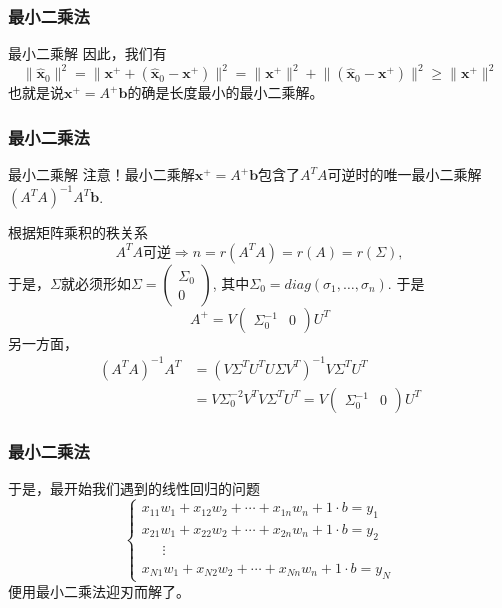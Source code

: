 
\begin{frame}
\frametitle{最小二乘法}

\begin{block}{最小二乘解}
因此，我们有
$$\lVert \widehat{\mathbf{x}}_0 \rVert^2 = \lVert \mathbf{x}^+ + (\widehat{\mathbf{x}}_0 - \mathbf{x}^+) \rVert^2 = \lVert \mathbf{x}^+ \rVert^2 + \lVert (\widehat{\mathbf{x}}_0 - \mathbf{x}^+) \rVert^2 \geqslant \lVert \mathbf{x}^+ \rVert^2$$
也就是说$\mathbf{x}^+ = A^+\mathbf{b}$的确是长度最小的最小二乘解。
\end{block}

\end{frame}


\begin{frame}
\frametitle{最小二乘法}

\begin{block}{最小二乘解}
{\color{red}注意}！最小二乘解$\mathbf{x}^+ = A^+\mathbf{b}$包含了$A^TA$可逆时的唯一最小二乘解$(A^TA)^{-1}A^T\mathbf{b}$.

\vspace{1em}
\pause

根据矩阵乘积的秩关系
$$A^TA\text{可逆} \Longrightarrow n = r(A^TA) = r(A) = r(\Sigma),$$
于是，$\Sigma$就必须形如$\Sigma = \begin{pmatrix} \Sigma_0 \\ 0 \end{pmatrix}$, 其中$\Sigma_0 = diag(\sigma_1, \ldots, \sigma_n)$. 于是
$$A^+ = V\begin{pmatrix} \Sigma_0^{-1} & 0 \end{pmatrix} U^T$$
另一方面，
\begin{align*}
(A^TA)^{-1}A^T & = (V\Sigma^TU^TU\Sigma V^T)^{-1} V\Sigma^TU^T \\
& = V \Sigma_0^{-2} V^T V\Sigma^TU^T = V\begin{pmatrix} \Sigma_0^{-1} & 0 \end{pmatrix} U^T
\end{align*}
\end{block}

\end{frame}


\begin{frame}
\frametitle{最小二乘法}

于是，最开始我们遇到的线性回归的问题
$$
\begin{cases}
x_{11}w_1 + x_{12}w_2 + \cdots + x_{1n}w_n + 1\cdot b = y_1 \\
x_{21}w_1 + x_{22}w_2 + \cdots + x_{2n}w_n + 1\cdot b = y_2 \\
\phantom{yyy} \vdots \\
x_{N1}w_1 + x_{N2}w_2 + \cdots + x_{Nn}w_n + 1\cdot b = y_N
\end{cases}$$
便用最小二乘法迎刃而解了。

\end{frame}

